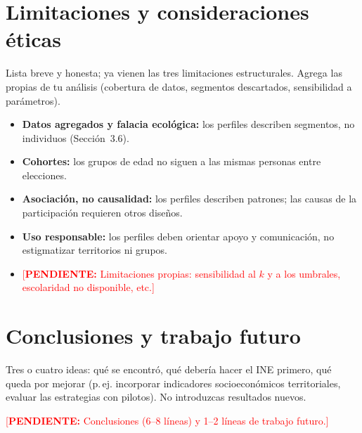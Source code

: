 \documentclass[11pt,letterpaper]{article}
\newcommand{\pend}[1]{\textcolor{red}{[\textbf{PENDIENTE:} #1]}}
\begin{document}
\section{Limitaciones y consideraciones \'eticas}
\begin{guia}
Lista breve y honesta; ya vienen las tres limitaciones estructurales. Agrega las propias de tu an\'alisis (cobertura de datos, segmentos descartados, sensibilidad a par\'ametros).
\end{guia}
\begin{itemize}
  \item \textbf{Datos agregados y falacia ecol\'ogica:} los perfiles describen segmentos, no individuos (Secci\'on~3.6).
  \item \textbf{Cohortes:} los grupos de edad no siguen a las mismas personas entre elecciones.
  \item \textbf{Asociaci\'on, no causalidad:} los perfiles describen patrones; las causas de la participaci\'on requieren otros dise\~nos.
  \item \textbf{Uso responsable:} los perfiles deben orientar apoyo y comunicaci\'on, no estigmatizar territorios ni grupos.
  \item \pend{Limitaciones propias: sensibilidad al $k$ y a los umbrales, escolaridad no disponible, etc.}
\end{itemize}

\section{Conclusiones y trabajo futuro}
\begin{guia}
Tres o cuatro ideas: qu\'e se encontr\'o, qu\'e deber\'ia hacer el INE primero, qu\'e queda por mejorar (p.\,ej. incorporar indicadores socioecon\'omicos territoriales, evaluar las estrategias con pilotos). No introduzcas resultados nuevos.
\end{guia}
\pend{Conclusiones (6--8 l\'ineas) y 1--2 l\'ineas de trabajo futuro.}
\end{document}
